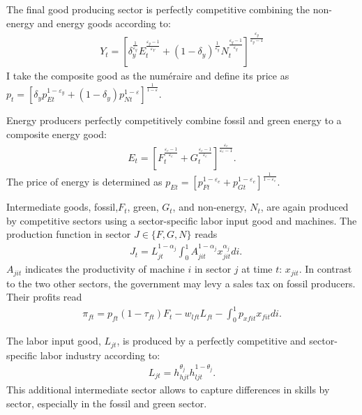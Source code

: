 The final good producing sector is perfectly competitive combining the non-energy and energy goods according to:
\begin{align}
Y_t=\left[\delta_y^\frac{1}{\varepsilon_y}E_{t}^{\frac{\varepsilon_y-1}{\varepsilon_Y}}+(1-\delta_y)^\frac{1}{\varepsilon_y}N_{t}^{\frac{\varepsilon_y-1}{\varepsilon_y}}\right]^\frac{\varepsilon_y}{\varepsilon_y-1}
\end{align} 
I take the composite good as the numéraire and define its price as $p_t=\left[\delta_yp_{Et}^{1-\varepsilon_y}+(1-\delta_y)p_{Nt}^{1-\varepsilon}\right]^{\frac{1}{1-\varepsilon}}$.

Energy producers perfectly competitively combine fossil and green energy to a composite energy good:
\begin{align}
E_t=\left[F_t^\frac{\varepsilon_e-1}{\varepsilon_e}+G_t^\frac{\varepsilon_e-1}{\varepsilon_e}\right]^\frac{\varepsilon_e}{\varepsilon_e-1}.
\end{align}
The price of energy is determined as  $p_{Et}= \left[p_{Ft}^{1-\varepsilon_e}+p_{Gt}^{1-\varepsilon_e}\right]^\frac{1}{{1-\varepsilon_e}}$.

Intermediate goods, fossil,$F_t$, green, $G_t$, and non-energy, $N_t$, are again produced by competitive sectors using a sector-specific labor input good and machines. The production function in sector $J\in \{F,G,N\}$ reads
\begin{align}
&J_{t}= L_{jt}^{1-\alpha_j}\int_{0}^{1}A_{jit}^{1-\alpha_j}x_{jit}^{\alpha_j} di.
\end{align}
$A_{jit}$ indicates the productivity of machine $i$ in sector $j$ at time $t$: $x_{jit}$. In contrast to the two other sectors, the government may levy a sales tax on fossil producers. Their profits read
\begin{align}
\pi_{ft}=p_{ft}(1-\tau_{ft})F_t-w_{lft}L_{ft}-\int_{0}^{1}p_{xfit}x_{fit}di.
\end{align}

The labor input good, $L_{jt}$, is produced by a perfectly competitive and sector-specific labor industry according to: 
\begin{align}
L_{jt}=h_{hjt}^{\theta_j}h_{ljt}^{1-\theta_j}.
\end{align}
This additional intermediate sector allows to capture differences in skills by sector, especially in the fossil and green sector.

